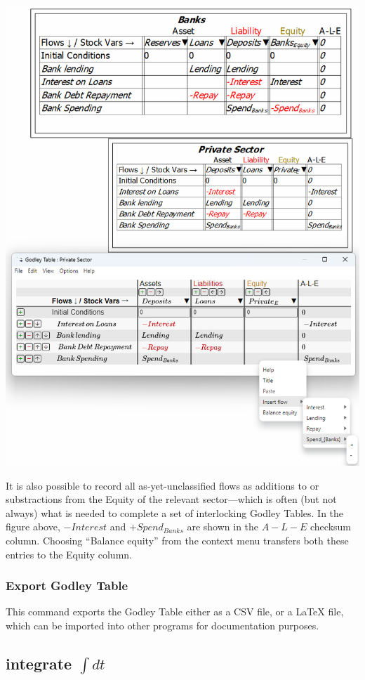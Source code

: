 \noindent\includegraphics[width=\textwidth]{images/GodleyTableContextMenu}

It is also possible to record all as-yet-unclassified flows as additions
to or substractions from the Equity of the relevant sector---which
is often (but not always) what is needed to complete a set of interlocking
Godley Tables. In the figure above, $-Interest$ and $+Spend_{Banks}$
are shown in the $A-L-E$ checksum column. Choosing ``Balance equity''
from the context menu transfers both these entries to the Equity column.

\subsubsection{Export Godley Table}

This command exports the Godley Table either as a CSV file, or a LaTeX
file, which can be imported into other programs for documentation
purposes.

\subsection{integrate $\int dt$}

